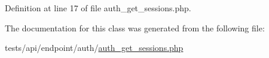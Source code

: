 Definition at line 17 of file auth\+\_\+get\+\_\+sessions.\+php.



The documentation for this class was generated from the following file\+:\begin{DoxyCompactItemize}
\item 
tests/api/endpoint/auth/\hyperlink{tests_2api_2endpoint_2auth_2auth__get__sessions_8php}{auth\+\_\+get\+\_\+sessions.\+php}\end{DoxyCompactItemize}
